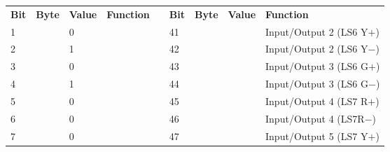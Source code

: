 \documentclass[]{article}
\begin{document}
\begin{landscape}
\begin{table}[ht]
	\centering
	\footnotesize
 
		\begin{tabular}{lllllllll}
			\cline{1-4} \cline{6-9}
			\textbf{Bit} & \textbf{Byte}       & \textbf{Value}     & \textbf{Function}              &                    & \textbf{Bit}             & \textbf{Byte}                              & \textbf{Value}                             & \textbf{Function}                      \\ \cline{1-4} \cline{6-9} 
			1            &                     & 0                  &                                &                    & 41                       &                                            &                                            & Input/Output 2 (LS6 Y$+$)              \\
			2            &                     & 1                  &                                &                    & 42                       &                                            &                                            & Input/Output 2 (LS6 Y$-$)              \\
			3            &                     & 0                  &                                &                    & 43                       &                                            &                                            & Input/Output 3 (LS6 G$+$)              \\
			4            &                     & 1                  &                                &                    & 44                       &                                            &                                            & Input/Output 3 (LS6 G$-$)              \\
			5            &                     & 0                  &                                &                    & 45                       &                                            &                                            & Input/Output 4 (LS7 R$+$)              \\
			6            &                     & 0                  &                                &                    & 46                       &                                            &                                            & Input/Output 4 (LS7R$-$)               \\
			7            &                     & 0                  &                                &                    & 47                       &                                            &                                            & Input/Output 5 (LS7 Y$+$)              \\

\end{tabular}
\end{table}
\end{landscape}
\end{document}

